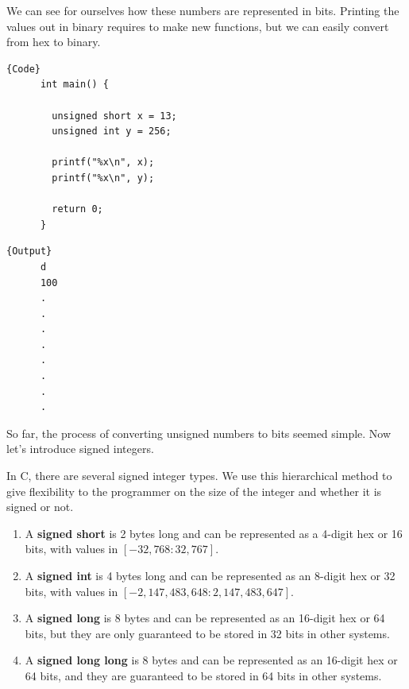   \begin{example}
    We can see for ourselves how these numbers are represented in bits. Printing the values out in binary requires to make new functions, but we can easily convert from hex to binary. 

    \noindent\begin{minipage}{.5\textwidth}
    \begin{lstlisting}[]{Code}
      int main() { 

        unsigned short x = 13; 
        unsigned int y = 256;

        printf("%x\n", x);
        printf("%x\n", y);

        return 0; 
      }
    \end{lstlisting}
    \end{minipage}
    \hfill
    \begin{minipage}{.49\textwidth}
    \begin{lstlisting}[]{Output}
      d
      100 
      .
      .
      .
      .
      .
      .
      .
      .
    \end{lstlisting}
    \end{minipage}
  \end{example}

  So far, the process of converting unsigned numbers to bits seemed simple. Now let's introduce signed integers. 

  \begin{definition}
    In C, there are several signed integer types. We use this hierarchical method to give flexibility to the programmer on the size of the integer and whether it is signed or not. 
    \begin{enumerate} 
      \item A \textbf{signed short} is 2 bytes long and can be represented as a 4-digit hex or 16 bits, with values in $[-32,768: 32,767]$. 
      \item A \textbf{signed int} is 4 bytes long and can be represented as an 8-digit hex or 32 bits, with values in $[-2,147,483,648: 2,147,483,647]$. 
      \item A \textbf{signed long} is 8 bytes and can be represented as an 16-digit hex or 64 bits, but they are only guaranteed to be stored in 32 bits in other systems. 
      \item A \textbf{signed long long} is 8 bytes and can be represented as an 16-digit hex or 64 bits, and they are guaranteed to be stored in 64 bits in other systems. 
    \end{enumerate}
  \end{definition}

